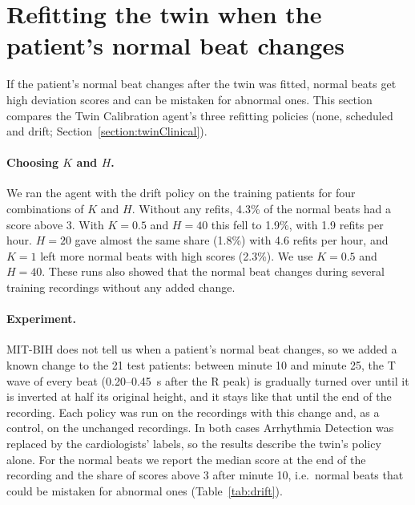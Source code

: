 \section{Refitting the twin when the patient's normal beat changes}
\label{section:drift}

If the patient's normal beat changes after the twin was fitted, normal beats get high deviation scores and can be mistaken for abnormal ones. This section compares the Twin Calibration agent's three refitting policies (none, scheduled and drift; Section~\ref{section:twinClinical}).

\paragraph{Choosing $K$ and $H$.} We ran the agent with the drift policy on the training patients for four combinations of $K$ and $H$. Without any refits, 4.3\% of the normal beats had a score above 3. With $K = 0.5$ and $H = 40$ this fell to 1.9\%, with 1.9 refits per hour. $H = 20$ gave almost the same share (1.8\%) with 4.6 refits per hour, and $K = 1$ left more normal beats with high scores (2.3\%). We use $K = 0.5$ and $H = 40$. These runs also showed that the normal beat changes during several training recordings without any added change.

\paragraph{Experiment.} MIT-BIH does not tell us when a patient's normal beat changes, so we added a known change to the 21 test patients: between minute 10 and minute 25, the T wave of every beat (0.20--0.45~s after the R peak) is gradually turned over until it is inverted at half its original height, and it stays like that until the end of the recording. Each policy was run on the recordings with this change and, as a control, on the unchanged recordings. In both cases Arrhythmia Detection was replaced by the cardiologists' labels, so the results describe the twin's policy alone. For the normal beats we report the median score at the end of the recording and the share of scores above 3 after minute 10, i.e.\ normal beats that could be mistaken for abnormal ones (Table~\ref{tab:drift}).

